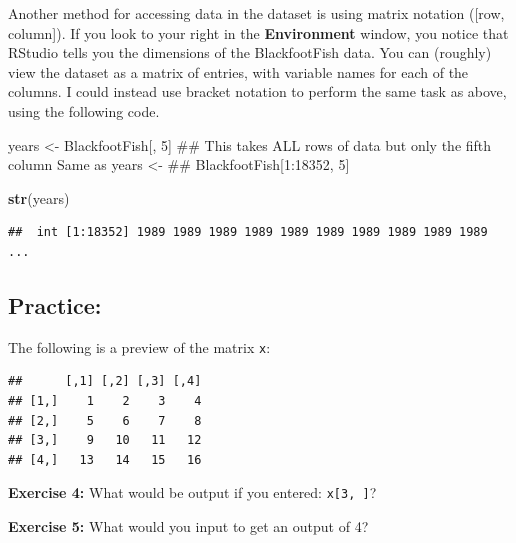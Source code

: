 \documentclass[]{article}
\newenvironment{Shaded}{\begin{snugshade}}{\end{snugshade}}
\newcommand{\KeywordTok}[1]{\textcolor[rgb]{0.13,0.29,0.53}{\textbf{#1}}}
\newcommand{\DecValTok}[1]{\textcolor[rgb]{0.00,0.00,0.81}{#1}}
\newcommand{\StringTok}[1]{\textcolor[rgb]{0.31,0.60,0.02}{#1}}
\newcommand{\NormalTok}[1]{#1}
\begin{document}
\vspace{0.25cm}

Another method for accessing data in the dataset is using matrix
notation ({[}row, column{]}). If you look to your right in the
\textbf{Environment} window, you notice that RStudio tells you the
dimensions of the BlackfootFish data. You can (roughly) view the dataset
as a matrix of entries, with variable names for each of the columns. I
could instead use bracket notation to perform the same task as above,
using the following code.

\vspace{0.25cm}

\begin{Shaded}
\begin{Highlighting}[]
\NormalTok{years <-}\StringTok{ }\NormalTok{BlackfootFish[, }\DecValTok{5}\NormalTok{]}
\NormalTok{## This takes ALL rows of data but only the fifth column Same as years <-}
\NormalTok{## BlackfootFish[1:18352, 5]}

\KeywordTok{str}\NormalTok{(years)}
\end{Highlighting}
\end{Shaded}

\begin{verbatim}
##  int [1:18352] 1989 1989 1989 1989 1989 1989 1989 1989 1989 1989 ...
\end{verbatim}

\subsection{Practice:}\label{practice}

The following is a preview of the matrix \texttt{x}:

\begin{verbatim}
##      [,1] [,2] [,3] [,4]
## [1,]    1    2    3    4
## [2,]    5    6    7    8
## [3,]    9   10   11   12
## [4,]   13   14   15   16
\end{verbatim}

\vspace{0.25cm}

\textbf{Exercise 4:} What would be output if you entered:
\texttt{x{[}3,\ {]}}?

\vspace{0.25cm}

\textbf{Exercise 5:} What would you input to get an output of 4?

\vspace{1.5cm}
\end{document}
